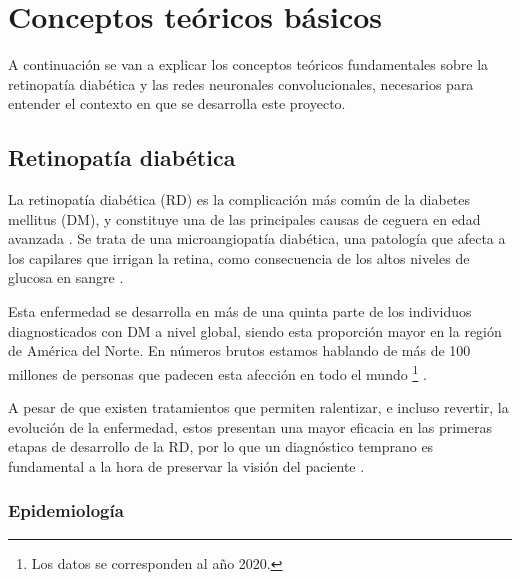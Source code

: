 \titlespacing{\section}{0pt}{0.25cm}{0.15cm}
\section{Conceptos teóricos básicos}

A continuación se van a explicar los conceptos teóricos fundamentales sobre la retinopatía diabética y las redes neuronales convolucionales, necesarios para entender el contexto en que se desarrolla este proyecto.

\titlespacing{\subsection}{0pt}{0.25cm}{0.15cm}
\subsection{Retinopatía diabética}

La retinopatía diabética (RD) es la complicación más común de la diabetes mellitus (DM), y constituye una de las principales causas de ceguera en edad avanzada \cite{diabetes:JDI, retinopatia:Retinal_and_eye}. Se trata de una microangiopatía diabética, una patología que afecta a los capilares que irrigan la retina, como consecuencia de los altos niveles de glucosa en sangre \cite{retinopatia:chile}.

Esta enfermedad se desarrolla en más de una quinta parte de los individuos diagnosticados con DM a nivel global, siendo esta proporción mayor en la región de América del Norte. En números brutos estamos hablando de más de 100 millones de personas que padecen esta afección en todo el mundo \footnote{Los datos se corresponden al año 2020.} \cite{retinopatia:ophtalmology}.

A pesar de que existen tratamientos que permiten ralentizar, e incluso revertir, la evolución de la enfermedad, estos presentan una mayor eficacia en las primeras etapas de desarrollo de la RD, por lo que un diagnóstico temprano es fundamental a la hora de preservar la visión del paciente \cite{diabetes:JDI}.

\titlespacing{\subsubsection}{0pt}{0.25cm}{0.1cm}
\subsubsection{Epidemiología}

